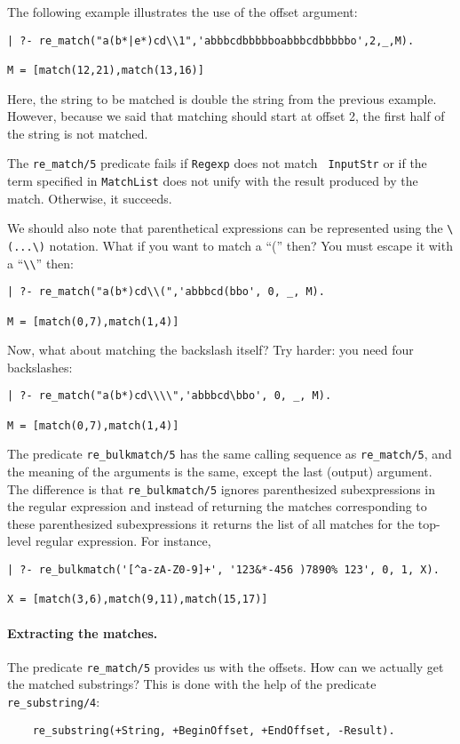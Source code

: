 The following example illustrates the use of the offset argument:
\begin{verbatim}
| ?- re_match("a(b*|e*)cd\\1",'abbbcdbbbbboabbbcdbbbbbo',2,_,M).  

M = [match(12,21),match(13,16)]  
\end{verbatim}
Here, the string to be matched is double the string from the previous
example. However, because we said that matching should start at offset 2,
the first half of the string is not matched.

The \verb|re_match/5| predicate fails if {\tt Regexp} does not match {\tt
  InputStr} or if the term specified in {\tt MatchList} does not unify with
the result produced by the match.  Otherwise, it succeeds.

We should also note that parenthetical expressions can be represented
using the \verb|\(...\)| notation. What if you want to match a ``('' then?
You must escape it with a ``\verb|\\|'' then:
\begin{verbatim}
| ?- re_match("a(b*)cd\\(",'abbbcd(bbo', 0, _, M).

M = [match(0,7),match(1,4)]
\end{verbatim}
Now, what about matching the backslash itself? Try harder: you need four
backslashes: 
\begin{verbatim}
| ?- re_match("a(b*)cd\\\\",'abbbcd\bbo', 0, _, M).

M = [match(0,7),match(1,4)]
\end{verbatim}

The predicate \verb|re_bulkmatch/5| has the same calling sequence as
\verb|re_match/5|, and the meaning of the arguments is the same, except the
last (output) argument. The difference is that \verb|re_bulkmatch/5|
ignores parenthesized subexpressions in the regular expression and instead
of returning the matches corresponding to these parenthesized
subexpressions it returns the list of all matches for the top-level regular
expression. For instance, 
\begin{verbatim}
| ?- re_bulkmatch('[^a-zA-Z0-9]+', '123&*-456 )7890% 123', 0, 1, X).

X = [match(3,6),match(9,11),match(15,17)]  
\end{verbatim}

\paragraph{Extracting the matches.}
The predicate \verb|re_match/5| provides us with the offsets. How can we
actually get the matched substrings? This is done with the help of the
predicate \verb|re_substring/4|:
\begin{verbatim}
    re_substring(+String, +BeginOffset, +EndOffset, -Result).
\end{verbatim}

